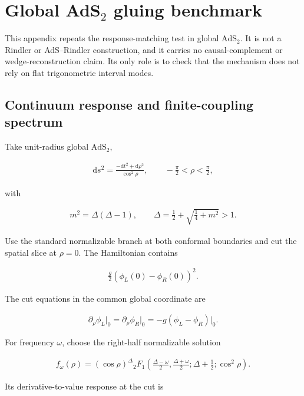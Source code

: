 \section{\texorpdfstring{Global AdS$_2$ gluing benchmark}{Global AdS2 gluing benchmark}}\label{app:global-ads2}

This appendix repeats the response-matching test in global $\mathrm{AdS}_2$. It is not a Rindler or AdS--Rindler construction, and it carries no causal-complement or wedge-reconstruction claim. Its only role is to check that the mechanism does not rely on flat trigonometric interval modes.

\subsection{Continuum response and finite-coupling spectrum}\label{subsec:ads2-continuum}

Take unit-radius global $\mathrm{AdS}_2$,

\begin{align}
\mathrm ds^2
=\frac{-\mathrm dt^2+\mathrm d\rho^2}{\cos^2\rho},
\qquad
-\frac\pi2<\rho<\frac\pi2,
\end{align}

with

\begin{align}
m^2=\Delta(\Delta-1),
\qquad
\Delta=\frac12+\sqrt{\frac14+m^2}>1.
\end{align}

Use the standard normalizable branch at both conformal boundaries and cut the spatial slice at $\rho=0$. The Hamiltonian contains

\begin{align}
\frac g2\left(\phi_L(0)-\phi_R(0)\right)^2.
\end{align}

The cut equations in the common global coordinate are

\begin{align}
\partial_\rho\phi_L\big|_0
=\partial_\rho\phi_R\big|_0
=-g(\phi_L-\phi_R)\big|_0.
\end{align}

For frequency $\omega$, choose the right-half normalizable solution

\begin{align}
f_\omega(\rho)
=(\cos\rho)^\Delta
{}_2F_1\left(
\frac{\Delta-\omega}{2},
\frac{\Delta+\omega}{2};
\Delta+\frac12;
\cos^2\rho
\right).
\end{align}

Its derivative-to-value response at the cut is

